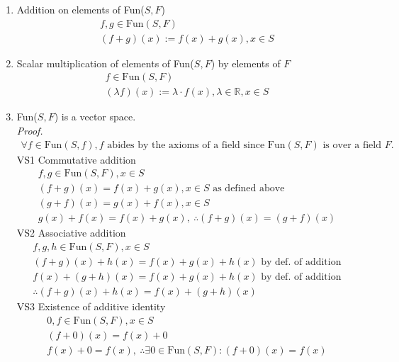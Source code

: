\documentclass{article}
\begin{document}
\begin{enumerate}
    \begin{enumerate}
        \item Addition on elements of Fun($S,F$)
        \begin{gather*}
            f,g \in \textrm{Fun}(S,F) \\
            (f+g)(x):=f(x)+g(x), x \in S
        \end{gather*}
        \item Scalar multiplication of elements of Fun($S, F$) by elements of $F$
        \begin{gather*}
            f \in \textrm{Fun}(S,F) \\
            (\lambda f)(x) := \lambda \cdot f(x), \lambda \in \mathbb{R}, x \in S
        \end{gather*}
        \item Fun($S, F$) is a vector space. \\
        \textit{Proof.} 
        \begin{gather*}
            \forall f \in \textrm{Fun}(S,f), f \textrm{ abides by the axioms of a field since Fun}(S,F) \textrm{ is over a field } F.
        \end{gather*}
        VS1 Commutative addition
        \begin{gather*}
            f,g \in \textrm{Fun}(S,F), x \in S \\
            (f+g)(x) = f(x)+g(x), x \in S \textrm{ as defined above} \\
            (g+f)(x) = g(x)+f(x), x \in S \\
            g(x) + f(x) = f(x) + g(x), \ \therefore (f+g)(x) = (g+f)(x)
        \end{gather*}
        VS2 Associative addition
        \begin{gather*}
            f,g,h \in \textrm{Fun}(S,F), x \in S \\
            (f+g)(x) + h(x) = f(x) + g(x) + h(x) \textrm{ by def. of addition} \\
            f(x) + (g+h)(x) = f(x) + g(x) + h(x) \textrm{ by def. of addition} \\
            \therefore (f+g)(x)+h(x) = f(x) + (g+h)(x)
        \end{gather*}
        VS3 Existence of additive identity
        \begin{gather*}
            0,f \in \textrm{Fun}(S,F), x \in S \\
            (f + 0)(x) = f(x) + 0 \\
            f(x) + 0 = f(x), \ \therefore \exists 0 \in \textrm{Fun}(S,F) : (f+0)(x) = f(x) \\

\end{gather*}
\end{enumerate}
\end{enumerate}
\end{document}
